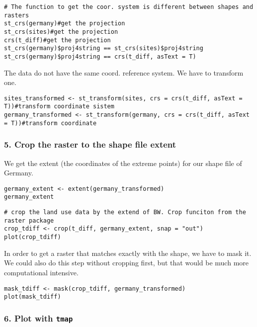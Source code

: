 \documentclass[
]{book}
\theoremstyle{definition}
\theoremstyle{definition}
\theoremstyle{definition}
\theoremstyle{definition}
\theoremstyle{remark}
\begin{document}
\begin{verbatim}
# The function to get the coor. system is different between shapes and rasters
st_crs(germany)#get the projection
st_crs(sites)#get the projection
crs(t_diff)#get the projection
st_crs(germany)$proj4string == st_crs(sites)$proj4string
st_crs(germany)$proj4string == crs(t_diff, asText = T)
\end{verbatim}

The data do not have the same coord. reference system. We have to transform one.

\begin{verbatim}
sites_transformed <- st_transform(sites, crs = crs(t_diff, asText = T))#transform coordinate sistem
germany_transformed <- st_transform(germany, crs = crs(t_diff, asText = T))#transform coordinate 
\end{verbatim}

\hypertarget{crop-the-raster-to-the-shape-file-extent}{%
\subsubsection{5. Crop the raster to the shape file extent}\label{crop-the-raster-to-the-shape-file-extent}}

We get the extent (the coordinates of the extreme points) for our shape file of Germany.

\begin{verbatim}
germany_extent <- extent(germany_transformed)
germany_extent
\end{verbatim}

\begin{verbatim}
# crop the land use data by the extend of BW. Crop funciton from the raster package
crop_tdiff <- crop(t_diff, germany_extent, snap = "out")
plot(crop_tdiff)
\end{verbatim}

In order to get a raster that matches exactly with the shape, we have to mask it.
We could also do this step without cropping first, but that would be much more computational intensive.

\begin{verbatim}
mask_tdiff <- mask(crop_tdiff, germany_transformed)
plot(mask_tdiff)
\end{verbatim}

\hypertarget{plot-with-tmap}{%
\subsubsection{\texorpdfstring{6. Plot with \texttt{tmap}}{6. Plot with tmap}}\label{plot-with-tmap}}
\end{document}
